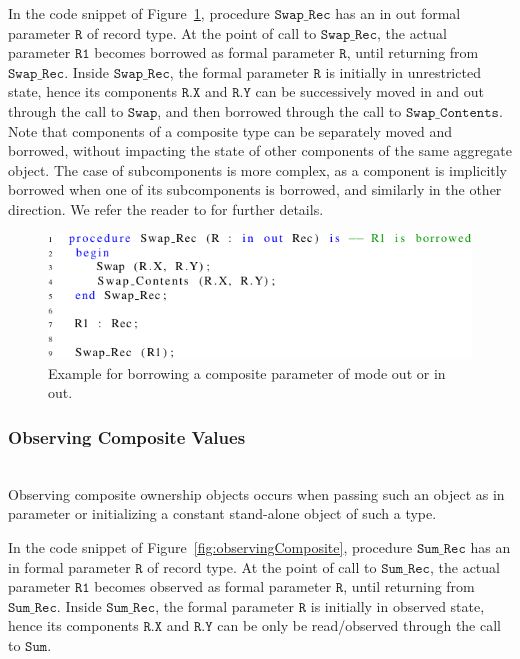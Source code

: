 \documentclass{llncs}
\newcommand\var[1]{\ensuremath{\mathtt{#1}}}
\newcommand{\keyword}[1]{\textsf{#1}}
\begin{document}
\smallskip
In the code snippet of Figure~\ref{fig:borrowingComposite}, procedure \var{Swap\_Rec} has an \keyword{in out} formal parameter \var{R} of record type. At the point of
call to \var{Swap\_Rec}, the actual parameter \var{R1} becomes borrowed as formal parameter \var{R}, until returning from \var{Swap\_Rec}. Inside \var{Swap\_Rec}, the formal parameter \var{R} is initially
in unrestricted state, hence its components \var{R.X} and \var{R.Y} can be successively moved in and out through the call to \var{Swap}, and then borrowed through the call to \var{Swap\_Contents}.
Note that components of a composite type can be separately moved and borrowed, without impacting the state of other components of the same aggregate object.
The case of subcomponents is more complex, as a component is implicitly borrowed when one of its subcomponents is borrowed, and similarly in the other direction.
We refer the reader to \cite{AI2017} for further details.

\begin{figure}[htb!]
\centering
   \includegraphics[]{borrowingComposite}
   \caption{Example for borrowing a composite parameter of mode \keyword{out} or \keyword{in out}.}
   \label{fig:borrowingComposite}
\end{figure}

   
\subsubsection{Observing Composite Values}
\label{subsubsec:extendingBorrowing}
\ \\

Observing composite ownership objects occurs when passing such an object as \keyword{in} parameter or initializing a constant stand-alone object of such a type. 

\smallskip
In the code snippet of Figure~\ref{fig:observingComposite}, procedure \var{Sum\_Rec} has an \keyword{in} formal parameter \var{R} of record type.
At the point of call to \var{Sum\_Rec}, the actual parameter \var{R1} becomes observed as formal parameter \var{R}, until returning from \var{Sum\_Rec}. Inside \var{Sum\_Rec},
the formal parameter \var{R} is initially in observed state, hence its components \var{R.X} and \var{R.Y} can be only be read/observed through the call to \var{Sum}.
\end{document}
